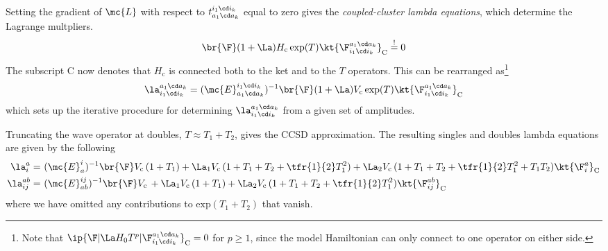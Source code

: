 \begin{dfn}
Setting the gradient of $\mc{L}$ with respect to $t_{a_1\cd a_k}^{i_1\cd i_k}$ equal to zero gives the \textit{coupled-cluster lambda equations}, which determine the Lagrange multpliers.
\begin{align}
  \br{\F}
  (
    1
  +
    \La
  )
  H_{\text{c}}\,
  \text{exp}(T)
  \kt{\F_{i_1\cd i_k}^{a_1\cd a_k}}_{\text{C}}
\overset{!}{=}
  0
\end{align}
The subscript $\text{C}$ now denotes that $H_{\text{c}}$ is connected both to the ket and to the $T$ operators.
This can be rearranged as\footnote{Note that $\ip{\F|\La H_0 T^p|\F_{i_1\cd i_k}^{a_1\cd a_k}}_{\text{C}}=0$ for $p\geq 1$, since the model Hamiltonian can only connect to one operator on either side.}
\begin{align}
  \la_{i_1\cd i_k}^{a_1\cd a_k}
=
  (\mc{E}_{a_1\cd a_k}^{i_1\cd i_k})^{-1}
  \br{\F}
  (
    1
  +
    \La
  )
  V_{\text{c}}\,
  \text{exp}(T)
  \kt{\F_{i_1\cd i_k}^{a_1\cd a_k}}_{\text{C}}
\end{align}
which sets up the iterative procedure for determining $\la_{i_1\cd i_k}^{a_1\cd a_k}$ from a given set of amplitudes.
\end{dfn}


\begin{ex}
Truncating the wave operator at doubles, $T\approx T_1 + T_2$, gives the CCSD approximation.
The resulting singles and doubles lambda equations are given by the following
\begin{align*}
  \la_i^a
=&\
  (\mc{E}_a^i)^{-1}
  \br{\F}
    V_{\text{c}}\,
    (
      1
    +
      T_1
    )
  +
    \La_1
    V_{\text{c}}\,
    (
      1
    +
      T_1
    +
      T_2
    +
      \tfr{1}{2}
      T_1^2
    )
  +
    \La_2
    V_{\text{c}}\,
    (
      1
    +
      T_1
    +
      T_2
    +
      \tfr{1}{2}
      T_1^2
    +
      T_1
      T_2
    )
  \kt{\F_i^a}_{\text{C}}
\\
  \la_{ij}^{ab}
=&\
  (\mc{E}_{ab}^{ij})^{-1}
  \br{\F}
    V_{\text{c}}\,
  +
    \La_1
    V_{\text{c}}\,
    (
      1
    +
      T_1
    )
  +
    \La_2
    V_{\text{c}}\,
    (
      1
    +
      T_1
    +
      T_2
    +
      \tfr{1}{2}
      T_1^2
    )
  \kt{\F_{ij}^{ab}}_{\text{C}}
\end{align*}
where we have omitted any contributions to $\text{exp}(T_1 + T_2)$ that vanish.
\end{ex}

